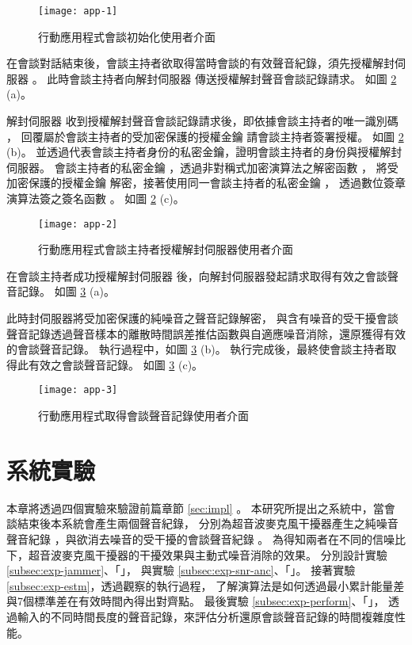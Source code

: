 \begin{figure}[H]
    \centering
    \texttt{[image: app-1]}
    \caption{行動應用程式會談初始化使用者介面}\label{fig:app-1}
\end{figure}

    在會談對話結束後，會談主持者欲取得當時會談的有效聲音紀錄，須先授權解封伺服器 \DEFserver。
此時會談主持者向解封伺服器 \DEFserver 傳送授權解封聲音會談記錄請求。
如圖 \ref{fig:app-2}  (a)。

    解封伺服器 \DEFserver 收到授權解封聲音會談記錄請求後，即依據會談主持者的唯一識別碼 \DEFownerID，
回覆屬於會談主持者的受加密保護的授權金鑰 \DEFakEnc 請會談主持者簽署授權。
如圖 \ref{fig:app-2}  (b)。
並透過代表會談主持者身份的私密金鑰，證明會談主持者的身份與授權解封伺服器。
會談主持者的私密金鑰 \DEFprivateKey，透過非對稱式加密演算法之解密函數 \DEFfuncDecSK{}，
將受加密保護的授權金鑰 \DEFakEnc 解密，接著使用同一會談主持者的私密金鑰 \DEFprivateKey，
透過數位簽章演算法簽之簽名函數 \DEFfuncSignSK{}。
如圖 \ref{fig:app-2}  (c)。

\begin{figure}[H]
    \centering
    \texttt{[image: app-2]}
    \caption{行動應用程式會談主持者授權解封伺服器使用者介面}\label{fig:app-2}
\end{figure}

    在會談主持者成功授權解封伺服器 \DEFserver 後，向解封伺服器發起請求取得有效之會談聲音記錄。
如圖 \ref{fig:app-3}  (a)。

    此時封伺服器將受加密保護的純噪音之聲音記錄解密，
與含有噪音的受干擾會談聲音記錄透過聲音樣本的離散時間誤差推估函數與自適應噪音消除，還原獲得有效的會談聲音記錄。
執行過程中，如圖 \ref{fig:app-3}  (b)。
執行完成後，最終使會談主持者取得此有效之會談聲音記錄。
如圖 \ref{fig:app-3}  (c)。

\begin{figure}[H]
    \centering
    \texttt{[image: app-3]}
    \caption{行動應用程式取得會談聲音記錄使用者介面}\label{fig:app-3}
\end{figure}


\section{系統實驗}

    本章將透過四個實驗來驗證前篇章節 \ref{sec:impl} 。
本研究所提出之系統中，當會談結束後本系統會產生兩個聲音紀錄，
分別為超音波麥克風干擾器產生之純噪音聲音紀錄 \DEFrecN，與欲消去噪音的受干擾的會談聲音紀錄 \DEFrecJ。
為得知兩者在不同的信噪比下，超音波麥克風干擾器的干擾效果與主動式噪音消除的效果。
分別設計實驗 \ref{subsec:exp-jammer}、「」，
與實驗 \ref{subsec:exp-snr-anc}、「」。
接著實驗 \ref{subsec:exp-estm}，透過觀察的執行過程，
了解演算法是如何透過最小累計能量差與7個標準差在有效時間內得出對齊點。
最後實驗 \ref{subsec:exp-perform}、「」，
透過輸入的不同時間長度的聲音記錄，來評估分析還原會談聲音記錄的時間複雜度性能。


